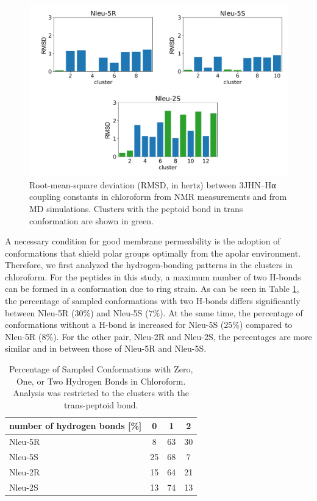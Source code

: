 \begin{figure}
    \centering
    \includegraphics[width=\textwidth]{7_chapter_5/fig/results/j3NMRConfClusterAna.png}
    \caption{ Root-mean-square deviation (RMSD, in hertz) between 3JHN–Hα coupling constants in chloroform from NMR measurements and from MD simulations. Clusters with the peptoid bond in trans conformation are shown in green.}
    \label{fig: j3NMRConfClusterAna}
\end{figure}

A necessary condition for good membrane permeability is the adoption of conformations that shield polar groups optimally from the apolar environment. \cite{Sebastiano2018, Alex2011, Tyagi2018}
Therefore, we first analyzed the hydrogen-bonding patterns in the clusters in chloroform. For the peptides in this study, a maximum number of two H-bonds can be formed in a conformation due to ring strain. As can be seen in Table \ref{tab: hbondsratio}, the percentage of sampled conformations with two H-bonds differs significantly between Nleu-5R ($30\%$) and Nleu-5S ($7\%$). At the same time, the percentage of conformations without a H-bond is increased for Nleu-5S ($25\%$) compared to Nleu-5R ($8\%$). For the other pair, Nleu-2R and Nleu-2S, the percentages are more similar and in between those of Nleu-5R and Nleu-5S.


\begin{table}[]
    \centering
    \begin{tabular}{l|c|c|c}
    number of hydrogen bonds [\%] &	0 &	1 &	2 \\
    \hline
    Nleu-5R  &	8	& 63	& 30 \\
    Nleu-5S  &	25	& 68	& 7  \\
    Nleu-2R  &	15	& 64	& 21 \\
    Nleu-2S  &	13	& 74	& 13 \\
    \end{tabular}
    \caption{Percentage of Sampled Conformations with Zero, One, or Two Hydrogen Bonds in Chloroform. Analysis was restricted to the clusters with the trans-peptoid bond.}
    \label{tab: hbondsratio}
\end{table}

